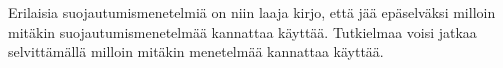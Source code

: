 \documentclass[finnish]{tktltiki2}
\theoremstyle{definition}
\theoremstyle{remark}
\begin{document}
	 Erilaisia suojautumismenetelmiä on niin laaja kirjo, että jää epäselväksi milloin mitäkin suojautumismenetelmää kannattaa käyttää. Tutkielmaa voisi jatkaa selvittämällä milloin mitäkin menetelmää kannattaa käyttää.
	
	



	
	
	
	
	
	
	
	
	
\end{document}
